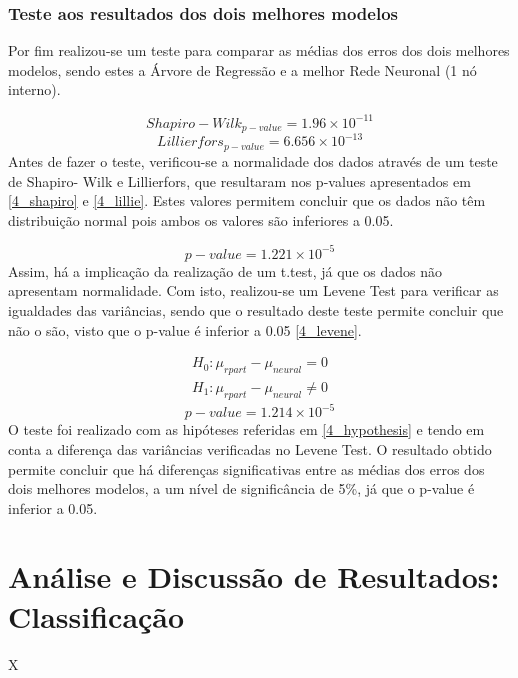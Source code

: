 \documentclass[conference]{IEEEtran}
\begin{document}
\subsubsection{Teste aos resultados dos dois melhores modelos}
Por fim realizou-se um teste para comparar as médias dos erros dos dois melhores modelos, sendo estes a Árvore de Regressão e a melhor Rede Neuronal (1 nó interno).

\begin{equation}
Shapiro-Wilk_{p-value}=1.96\times 10^{-11}\label{4_shapiro}
\end{equation}
\begin{equation}
Lillierfors_{p-value}=6.656\times 10^{-13}\label{4_lillie}
\end{equation}
Antes de fazer o teste, verificou-se a normalidade dos dados através de um teste de Shapiro- Wilk e Lillierfors, que resultaram nos p-values apresentados em \eqref{4_shapiro} e \eqref{4_lillie}. Estes valores permitem concluir que os dados não têm distribuição normal pois ambos os valores são inferiores a 0.05.

\begin{equation}
p-value=1.221\times 10^{-5}\label{4_levene}
\end{equation}
Assim, há a implicação da realização de um t.test, já que os dados não apresentam normalidade. Com isto, realizou-se um Levene Test para verificar as igualdades das variâncias, sendo que o resultado deste teste permite concluir que não o são, visto que o p-value é inferior a 0.05 \eqref{4_levene}.

\begin{equation}
  \begin{array}{l}
    H_{0}:\mu _{rpart} - \mu _{neural}=0 \\ 
    H_{1}:\mu _{rpart} - \mu _{neural}\neq 0
  \end{array}\label{4_hypothesis}
\end{equation}
\begin{equation}
p-value=1.214\times 10^{-5}\label{4_ttest}
\end{equation}
O teste foi realizado com as hipóteses referidas em \eqref{4_hypothesis} e tendo em conta a diferença das variâncias verificadas no Levene Test. O resultado obtido permite concluir que há diferenças significativas entre as médias dos erros dos dois melhores modelos, a um nível de significância de 5\%, já que o p-value é inferior a 0.05.



\section{Análise e Discussão de Resultados: Classificação} %
X
\end{document}

